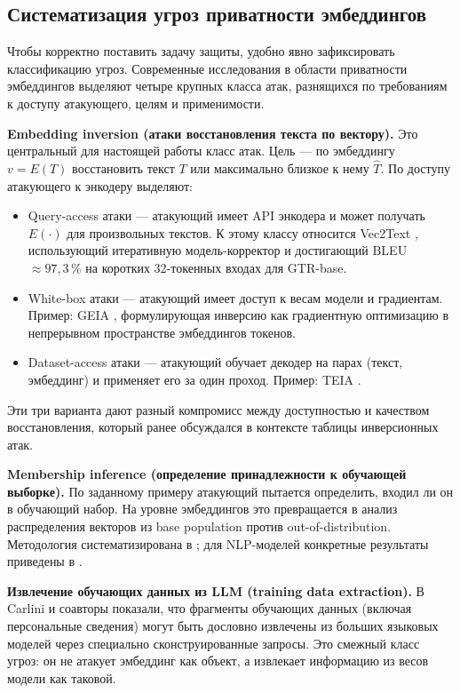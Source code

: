 \documentclass[a4paper, 12pt, oneside, openany]{article}
\begin{document}
\subsection{Систематизация угроз приватности эмбеддингов}\label{subsec:threat-systematics}

Чтобы корректно поставить задачу защиты, удобно явно зафиксировать классификацию угроз. Современные исследования в области приватности эмбеддингов \cite{ref5,ref6,ref7,ref8,ref40,ref41,ref42,ref43,ref45} выделяют четыре крупных класса атак, разнящихся по требованиям к доступу атакующего, целям и применимости.

\textbf{Embedding inversion (атаки восстановления текста по вектору).} Это центральный для настоящей работы класс атак. Цель --- по эмбеддингу $v = E(T)$ восстановить текст $T$ или максимально близкое к нему $\hat{T}$. По доступу атакующего к энкодеру выделяют:
\begin{itemize}
	\item Query-access атаки --- атакующий имеет API энкодера и может получать $E(\cdot)$ для произвольных текстов. К этому классу относится Vec2Text \cite{ref5}, использующий итеративную модель-корректор и достигающий BLEU $\approx 97{,}3\,\%$ на коротких 32-токенных входах для GTR-base.
	\item White-box атаки --- атакующий имеет доступ к весам модели и градиентам. Пример: GEIA \cite{ref7}, формулирующая инверсию как градиентную оптимизацию в непрерывном пространстве эмбеддингов токенов.
	\item Dataset-access атаки --- атакующий обучает декодер на парах (текст, эмбеддинг) и применяет его за один проход. Пример: TEIA \cite{ref8}.
\end{itemize}
Эти три варианта дают разный компромисс между доступностью и качеством восстановления, который ранее обсуждался в контексте таблицы инверсионных атак.

\textbf{Membership inference (определение принадлежности к обучающей выборке).} По заданному примеру атакующий пытается определить, входил ли он в обучающий набор. На уровне эмбеддингов это превращается в анализ распределения векторов из base population против out-of-distribution. Методология систематизирована в \cite{ref40}; для NLP-моделей конкретные результаты приведены в \cite{ref42}.

\textbf{Извлечение обучающих данных из LLM (training data extraction).} В \cite{ref41} Carlini и соавторы показали, что фрагменты обучающих данных (включая персональные сведения) могут быть дословно извлечены из больших языковых моделей через специально сконструированные запросы. Это смежный класс угроз: он не атакует эмбеддинг как объект, а извлекает информацию из весов модели как таковой.
\end{document}
